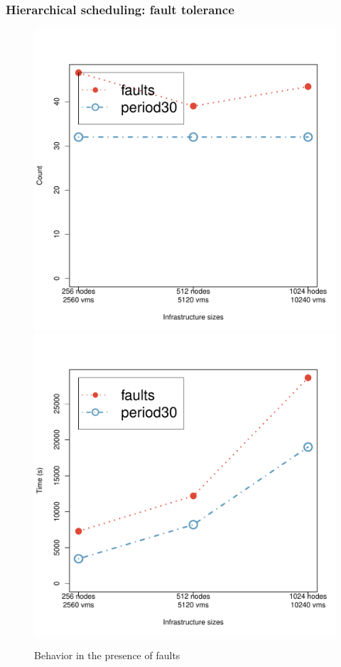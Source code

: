 


\subsubsection{Hierarchical scheduling: fault tolerance}

\begin{figure}\centering
  \includegraphics[width=.45\linewidth]{figures/snoozeFault-successPsize.pdf}
  \quad
  \includegraphics[width=.45\linewidth]{figures/snoozeFault-violationTime.pdf}
  \caption{Behavior in the presence of faults}
  \label{fig:snoozeFaults}
\end{figure}


